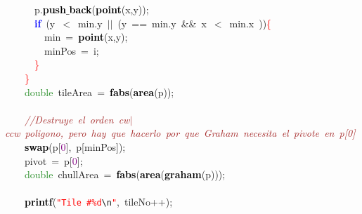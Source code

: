 {{\mbox{}\ \ \ \ \ \ p\textcolor{BrickRed}{.}\textbf{\textcolor{Black}{push$\_$back}}\textcolor{BrickRed}{(}\textbf{\textcolor{Black}{point}}\textcolor{BrickRed}{(}x\textcolor{BrickRed}{,}y\textcolor{BrickRed}{));}\ \ \ \ \ \  \\
\mbox{}\ \ \ \ \ \ \textbf{\textcolor{Blue}{if}}\ \textcolor{BrickRed}{(}y\ \textcolor{BrickRed}{$<$}\ min\textcolor{BrickRed}{.}y\ \textcolor{BrickRed}{$|$$|$}\ \textcolor{BrickRed}{(}y\ \textcolor{BrickRed}{==}\ min\textcolor{BrickRed}{.}y\ \textcolor{BrickRed}{\&\&}\ x\ \textcolor{BrickRed}{$<$}\ min\textcolor{BrickRed}{.}x\ \textcolor{BrickRed}{))}\textcolor{Red}{\{} \\
\mbox{}\ \ \ \ \ \ \ \ min\ \textcolor{BrickRed}{=}\ \textbf{\textcolor{Black}{point}}\textcolor{BrickRed}{(}x\textcolor{BrickRed}{,}y\textcolor{BrickRed}{);} \\
\mbox{}\ \ \ \ \ \ \ \ minPos\ \textcolor{BrickRed}{=}\ i\textcolor{BrickRed}{;} \\
\mbox{}\ \ \ \ \ \ \textcolor{Red}{\}} \\
\mbox{}\ \ \ \ \textcolor{Red}{\}} \\
\mbox{}\ \ \ \ \textcolor{ForestGreen}{double}\ tileArea\ \textcolor{BrickRed}{=}\ \textbf{\textcolor{Black}{fabs}}\textcolor{BrickRed}{(}\textbf{\textcolor{Black}{area}}\textcolor{BrickRed}{(}p\textcolor{BrickRed}{));} \\
\mbox{} \\
\mbox{}\ \ \ \ \textit{\textcolor{Brown}{//Destruye\ el\ orden\ cw$|$ccw\ poligono,\ pero\ hay\ que\ hacerlo\ por\ que\ Graham\ necesita\ el\ pivote\ en\ p[0]}} \\
\mbox{}\ \ \ \ \textbf{\textcolor{Black}{swap}}\textcolor{BrickRed}{(}p\textcolor{BrickRed}{[}\textcolor{Purple}{0}\textcolor{BrickRed}{],}\ p\textcolor{BrickRed}{[}minPos\textcolor{BrickRed}{]);} \\
\mbox{}\ \ \ \ pivot\ \textcolor{BrickRed}{=}\ p\textcolor{BrickRed}{[}\textcolor{Purple}{0}\textcolor{BrickRed}{];} \\
\mbox{}\ \ \ \ \textcolor{ForestGreen}{double}\ chullArea\ \textcolor{BrickRed}{=}\ \textbf{\textcolor{Black}{fabs}}\textcolor{BrickRed}{(}\textbf{\textcolor{Black}{area}}\textcolor{BrickRed}{(}\textbf{\textcolor{Black}{graham}}\textcolor{BrickRed}{(}p\textcolor{BrickRed}{)));} \\
\mbox{}\ \ \ \  \\
\mbox{}\ \ \ \ \textbf{\textcolor{Black}{printf}}\textcolor{BrickRed}{(}\texttt{\textcolor{Red}{"{}Tile\ \#\%d}}\texttt{\textcolor{CarnationPink}{\textbackslash{}n}}\texttt{\textcolor{Red}{"{}}}\textcolor{BrickRed}{,}\ tileNo\textcolor{BrickRed}{++);} \\
}}
